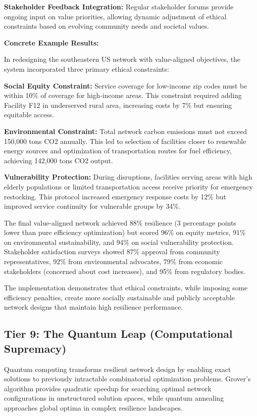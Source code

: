 \documentclass{article}
\begin{document}
\textbf{Stakeholder Feedback Integration:} Regular stakeholder forums provide ongoing input on value priorities, allowing dynamic adjustment of ethical constraints based on evolving community needs and societal values.

\textbf{Concrete Example Results:}

In redesigning the southeastern US network with value-aligned objectives, the system incorporated three primary ethical constraints:

\textbf{Social Equity Constraint:} Service coverage for low-income zip codes must be within 10\% of coverage for high-income areas. This constraint required adding Facility F12 in underserved rural area, increasing costs by 7\% but ensuring equitable access.

\textbf{Environmental Constraint:} Total network carbon emissions must not exceed 150,000 tons CO2 annually. This led to selection of facilities closer to renewable energy sources and optimization of transportation routes for fuel efficiency, achieving 142,000 tons CO2 output.

\textbf{Vulnerability Protection:} During disruptions, facilities serving areas with high elderly populations or limited transportation access receive priority for emergency restocking. This protocol increased emergency response costs by 12\% but improved service continuity for vulnerable groups by 34\%.

The final value-aligned network achieved 88\% resilience (3 percentage points lower than pure efficiency optimization) but scored 96\% on equity metrics, 91\% on environmental sustainability, and 94\% on social vulnerability protection. Stakeholder satisfaction surveys showed 87\% approval from community representatives, 92\% from environmental advocates, 79\% from economic stakeholders (concerned about cost increases), and 95\% from regulatory bodies.

The implementation demonstrates that ethical constraints, while imposing some efficiency penalties, create more socially sustainable and publicly acceptable network designs that maintain high resilience performance.

\subsection{Tier 9: The Quantum Leap (Computational Supremacy)}

Quantum computing transforms resilient network design by enabling exact solutions to previously intractable combinatorial optimization problems. Grover's algorithm provides quadratic speedup for searching optimal network configurations in unstructured solution spaces, while quantum annealing approaches global optima in complex resilience landscapes.
\end{document}
